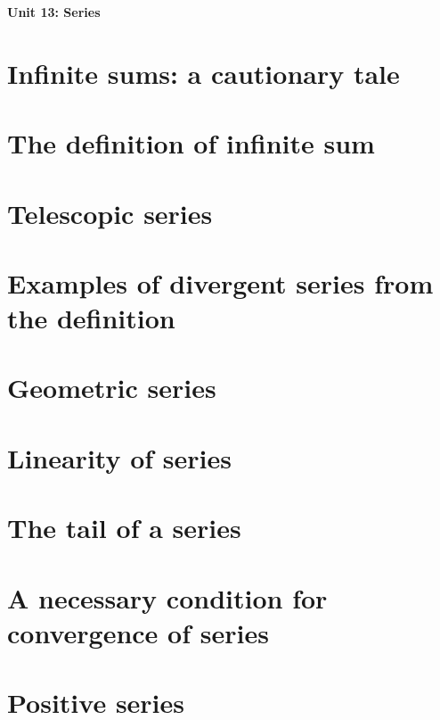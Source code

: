 

\usepackage{pgfplots}


\newtheorem{theorem}{Theorem}[section]
\newtheorem*{theorem*}{Theorem}
\newtheorem{definition}{Definition}[section]
{\LARGE \textbf{Unit 13: Series}}
\thispagestyle{empty}
\tableofcontents
\newpage
\clearpage
\setcounter{page}{1}
\section{Infinite sums: a cautionary tale}


\section{The definition of infinite sum}


\section{Telescopic series}


\section{Examples of divergent series from the definition}


\section{Geometric series}


\section{Linearity of series}


\section{The tail of a series}


\section{A necessary condition for convergence of series}


\section{Positive series}


